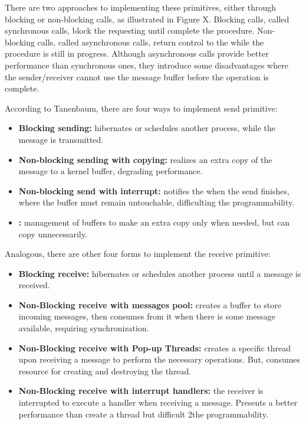 				There are two approaches to implementing these primitives, either
				through blocking or non-blocking calls, as illustrated in Figure X.
				Blocking calls, called synchronous calls, block the requesting \cpu
				until complete the procedure.
				Non-blocking calls, called asynchronous calls, return control to the
				\cpu while the procedure is still in progress.
				Although asynchronous calls provide better performance than
				synchronous ones, they introduce some disadvantages where the sender/receiver
				cannot use the message buffer before the operation is complete.

				According to Tanenbaum, there are four ways to implement send primitive:
				\begin{itemize}
					\item \textbf{Blocking sending:} \cpu hibernates or schedules another
						process, while the message is transmitted.
					\item \textbf{Non-blocking sending with copying:} realizes an extra copy of
						the message to a kernel buffer, degrading performance.
					\item \textbf{Non-blocking send with interrupt:} notifies the \cpu
						when the send finishes, where the buffer must remain untouchable,
						difficulting the programmability.
					\item \textbf{\cow:} management of buffers to make an extra copy only
						when needed, but can copy unnecessarily.
				\end{itemize}

				Analogous, there are other four forms to implement the receive primitive:
				\begin{itemize}
					\item \textbf{Blocking receive:} \cpu hibernates or schedules another
						process until a message is received.
					\item \textbf{Non-Blocking receive with messages pool:} \cpu creates
						a buffer to store incoming messages, then consumes from it when
						there is some message available, requiring synchronization.
					\item \textbf{Non-Blocking receive with Pop-up Threads:} creates a specific
						thread upon receiving a message to perform the necessary operations.
						But, consumes resource for creating and destroying the thread.
					\item \textbf{Non-Blocking receive with interrupt handlers:} the receiver
						is interrupted to execute a handler when receiving a message.
						Presents a better performance than create a thread but difficult
						2the programmability.
				\end{itemize}

